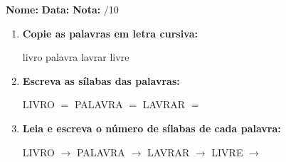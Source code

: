 \begin{exercicio}



\noindent\textbf{Nome:} \underline{\hspace{3.2cm}} \quad \textbf{Data:} \underline{\hspace{1.6cm}} \quad \textbf{Nota:} \underline{\hspace{0.9cm}}/10


\begin{enumerate}

  \item \textbf{Copie as palavras em letra cursiva:}
  \begin{center}
  livro \quad palavra \quad lavrar \quad livre
  \end{center}
  \begin{center}
  \underline{\hspace{2.4cm}} \quad \underline{\hspace{2.4cm}} \quad \underline{\hspace{2.4cm}} \quad \underline{\hspace{2.4cm}}
  \end{center}

  \item \textbf{Escreva as sílabas das palavras:}
  \begin{center}
  LIVRO $=$ \underline{\hspace{1.5cm}} \underline{\hspace{1.5cm}} \quad PALAVRA $=$ \underline{\hspace{1.5cm}} \underline{\hspace{1.5cm}} \quad LAVRAR $=$ \underline{\hspace{1.5cm}} \underline{\hspace{1.5cm}}
  \end{center}

  \item \textbf{Leia e escreva o número de sílabas de cada palavra:}
  \begin{center}
  LIVRO $\rightarrow$ \underline{\hspace{0.9cm}} \quad PALAVRA $\rightarrow$ \underline{\hspace{0.9cm}} \quad LAVRAR $\rightarrow$ \underline{\hspace{0.9cm}} \quad LIVRE $\rightarrow$ \underline{\hspace{0.9cm}}
  \end{center}


\end{enumerate}
\end{exercicio}

